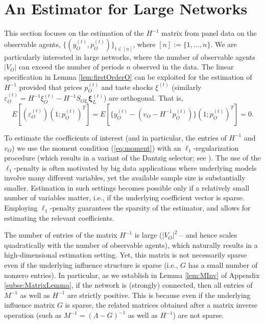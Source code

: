 \documentclass[opre,nonblindrev]{informs3} %
\begin{document}
\section{An Estimator for Large Networks} \label{se:estimation}
This section focuses on the estimation of 
the $H^{-1}$ matrix
 from
    panel data on the observable agents,
   $\{(y_O^{(t)},p_O^{(t)} ) \}_{t\in[n]}$, where
   $[n]:=\{1,\dots,n\}$.
We are particularly interested in large networks, where the number of observable agents
$|V_O|$ can exceed the number of periods $n$ observed in the data.
The linear specification in Lemma \ref{lem:firstOrderO}
can be exploited for the estimation of $H^{-1}$
provided that prices $p_O^{(t)}$ and taste shocks $\xi^{(t)}$ (similarly $\varepsilon_O^{(t)}=H^{-1} \xi_O^{(t)}-H^{-1} S_{OL} \mathbf{\xi}^{(t)}_L$)
are orthogonal. That is, 
\begin{equation}\label{eq:moment}
{E}[(\varepsilon_O^{(t)})(1;p_O^{(t)})^T]=
{E}[\{y_O^{(t)} - (v_O - H^{-1}p_O^{(t)})\}(1;p_O^{(t)})^T]=0.
\end{equation}

To estimate the coefficients of interest (and in particular, the entries of  $H^{-1}$ and $v_O$)
 we use the moment condition (\ref{eq:moment}) with an
$\ell_1$-regularization procedure (which results in a variant of the Dantzig selector; see \citet{CandesTao2007,belloni2017pivotal}).
The use of the $\ell_1$-penalty is often motivated by  big data applications where
underlying models involve
many different variables,
yet the available sample size is substantially smaller. Estimation in such settings becomes possible only if a relatively small number of variables matter, i.e., if the underlying coefficient vector is sparse.
Employing $\ell_1$-penalty guarantees the sparsity of the estimator, and  allows for estimating  the relevant coefficients.

The number of entries of the matrix $H^{-1}$ is large ($|V_O|^2$ -- and hence scales quadratically with the number of observable agents),
which naturally results in a high-dimensional estimation setting.
Yet, this matrix is not necessarily sparse  even if the underlying influence structure is sparse (i.e., $G$ has a small number of nonzero entries).
In particular, as we establish in
Lemma \ref{lem:MInv} of Appendix \ref{subse:MatrixLemma},
if the network is (strongly)
connected,
then all entries of $M^{-1}$ as well as $H^{-1}$ are strictly positive.
This is because even if the underlying influence matrix $G$ is sparse, the related matrices obtained after a matrix inverse operation
(such as $M^{-1} = (\Lambda-G)^{-1}$ as well as $H^{-1}$)
are not sparse.
\end{document}
